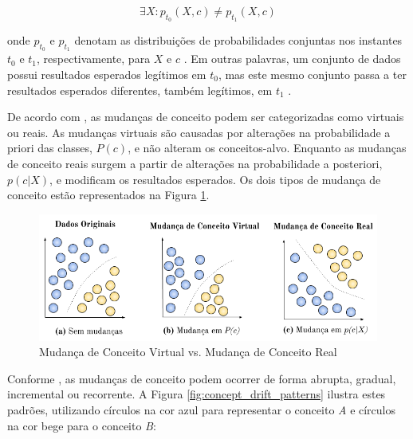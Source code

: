 \documentclass[qual, classic, a4paper]{ufbathesis}
\begin{document}
\begin{equation} \label{eq:3}
    {\exists}X : p_{t_0}(X, c) \ne p_{t_1}(X, c)
\end{equation}

onde $p_{t_0}$ e $p_{t_1}$ denotam as distribuições de probabilidades conjuntas nos instantes $t_0$ e $t_1$, respectivamente, 
para $X$ e $c$ \cite{Gama:2014:SCD:2597757.2523813}. 
Em outras palavras, um conjunto de dados possui resultados esperados legítimos em $t_0$, mas este mesmo conjunto passa a ter resultados esperados diferentes, também legítimos, em $t_1$ \cite{Kolter:2007:DWM:1314498.1390333}.

De acordo com , as mudanças de conceito podem ser categorizadas como virtuais ou reais.
As mudanças virtuais são causadas por alterações na probabilidade a priori das classes, $P(c)$, e não alteram os conceitos-alvo.
Enquanto as mudanças de conceito reais surgem a partir de alterações na probabilidade a posteriori, $p(c|X)$, e modificam os resultados esperados.
Os dois tipos de mudança de conceito estão representados na Figura \ref{fig:real_and_virtual_concept_drift}. 

\begin{figure}[H]
\begin{center}
    \includegraphics[scale=0.8]{imagens/concept_drift.png}
    \caption{Mudança de Conceito Virtual vs. Mudança de Conceito Real}
    \label{fig:real_and_virtual_concept_drift}
\end{center}
\end{figure}

Conforme , as mudanças de conceito podem ocorrer de forma abrupta, gradual, incremental ou recorrente.
A Figura \ref{fig:concept_drift_patterns} ilustra estes padrões, 
utilizando círculos na cor azul para representar o conceito \textit{A} e círculos na cor bege para o conceito \textit{B}:
\end{document}

